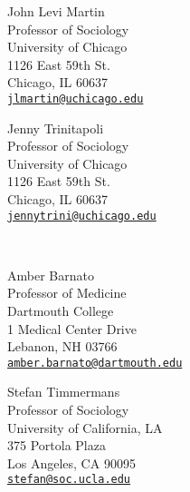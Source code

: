 \documentclass[11pt,article,oneside]{memoir}
\begin{document}
\begin{minipage}[t]{0.48\textwidth}
	John Levi Martin \\
	Professor of Sociology \\
	University of Chicago \\
	1126 East 59th St. \\
	Chicago, IL 60637 \\
	\texttt{\href{mailto:jlmartin@uchicago.edu}{jlmartin@uchicago.edu}}
\end{minipage}
\hfill
\begin{minipage}[t]{0.48\textwidth}
	Jenny Trinitapoli \\
	Professor of Sociology \\
	University of Chicago \\
	1126 East 59th St. \\
	Chicago, IL 60637 \\
	\texttt{\href{mailto:jennytrini@uchicago.edu}{jennytrini@uchicago.edu}} \\
\end{minipage} \\

\bigskip

\begin{minipage}[t]{0.48\textwidth}
	Amber Barnato \\
	Professor of Medicine \\
	Dartmouth College \\
	1 Medical Center Drive \\
	Lebanon, NH 03766 \\
	\texttt{\href{mailto:amber.barnato@dartmouth.edu}{amber.barnato@dartmouth.edu}} \\
\end{minipage}
\hfill
\begin{minipage}[t]{0.48\textwidth}
	Stefan Timmermans \\
	Professor of Sociology \\
	University of California, LA \\
	375 Portola Plaza \\
	Los Angeles, CA 90095 \\
	\texttt{\href{mailto:stefan@soc.ucla.edu}{stefan@soc.ucla.edu}}
\end{minipage}
\end{document}
